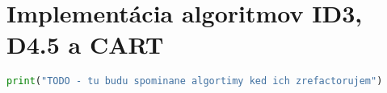 \chapter{Implementácia algoritmov ID3, D4.5 a CART}

\begin{lstlisting}[language=python, label=src:TreeAlgsImpl,caption={Zdrojové kódy algoritmov ID3, D4.5 a CART}]
print("TODO - tu budu spominane algortimy ked ich zrefactorujem")
\end{lstlisting}